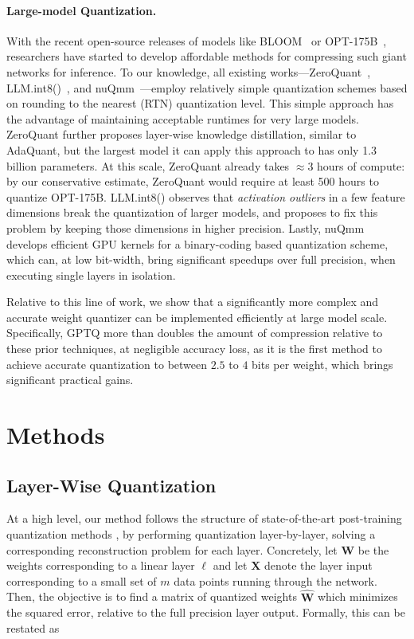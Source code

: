 \paragraph{Large-model Quantization.} With the recent open-source releases of models like BLOOM~\cite{laurencconbigscience} or OPT-175B~\cite{zhang2022opt}, researchers have started to develop affordable methods for compressing such giant networks for inference. To our knowledge, all existing works---ZeroQuant~\cite{yao2022zeroquant}, LLM.int8()~\cite{dettmers2022llm}, and nuQmm~\cite{park2022nuqmm}---employ relatively simple quantization schemes based on rounding to the nearest (RTN) quantization level. This simple approach has the advantage of maintaining acceptable runtimes for very large models. ZeroQuant further proposes layer-wise knowledge distillation, similar to AdaQuant, but the largest model it can apply this approach to has only 1.3 billion parameters. At this scale, ZeroQuant already takes $\approx 3$ hours of compute: by our conservative estimate, ZeroQuant would require at least 500 hours to quantize OPT-175B. LLM.int8() observes that \emph{activation outliers} in a few feature dimensions break the quantization of larger models, and proposes to fix this problem by keeping those dimensions in higher precision. Lastly, nuQmm develops efficient GPU kernels for a binary-coding based quantization scheme, which can, at low bit-width, bring significant speedups over full precision, when executing single layers in isolation. 

Relative to this line of work, we show that a significantly more complex and accurate weight quantizer can be implemented efficiently at large model scale. Specifically, GPTQ more than doubles the amount of compression relative to these prior techniques, at negligible accuracy loss, as it is the first method to achieve accurate quantization to between $2.5$ to $4$ bits per weight, which brings significant practical gains.  

\section{Methods}

\subsection{Layer-Wise Quantization}
\label{sec:layerwise-quantization}

At a high level, our method follows the structure of state-of-the-art post-training quantization methods \cite{nagel2020up, wang2020towards, hubara2021accurate, frantar2022obc}, by performing quantization  layer-by-layer, solving a corresponding reconstruction problem for each layer. Concretely, let $\mathbf{W}$ be the weights corresponding to a linear layer $\ell$ and let $\mathbf{X}$ denote the layer input corresponding to a small set of $m$ data points running through the network. Then, the objective is to find a matrix of quantized weights $\mathbf{\widehat{W}}$ which minimizes the squared error, relative to the full precision layer output. Formally, this can be restated as


